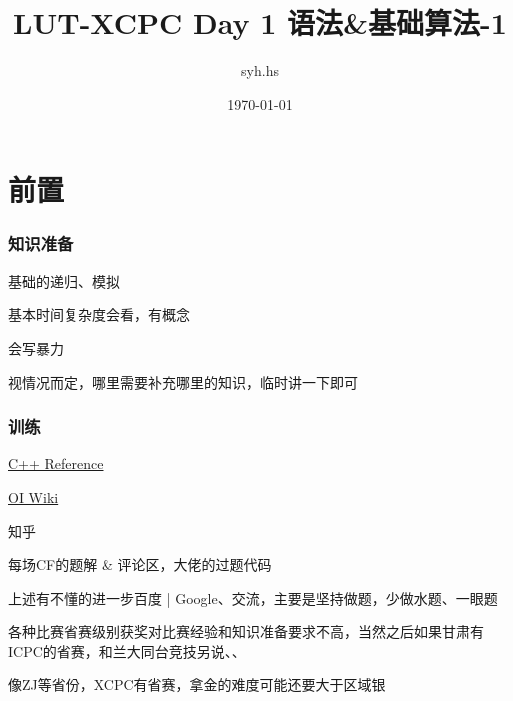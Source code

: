 \documentclass{beamer}
\author{syh.hs}
\title{LUT-XCPC Day 1 语法\&基础算法-1}
\date{\today}
\institute{兰州理工大学}
\begin{document}

  
  
  
  \section{前置}


  \begin{frame}
    \frametitle{知识准备}
    基础的递归、模拟

    基本时间复杂度会看，有概念

    会写暴力

    视情况而定，哪里需要补充哪里的知识，临时讲一下即可
  \end{frame}
  \begin{frame}
    \frametitle{训练}
    \href{https://en.cppreference.com/w/}{C++ Reference}

    \href{https://oi-wiki.org/}{OI Wiki}

    知乎

    每场CF的题解 \& 评论区，大佬的过题代码

    \vspace*{1\baselineskip}
    
    上述有不懂的进一步百度 | Google、交流，主要是坚持做题，少做水题、一眼题
    
    \vspace*{1\baselineskip}
    
    各种比赛省赛级别获奖对比赛经验和知识准备要求不高，当然之后如果甘肃有ICPC的省赛，和兰大同台竞技另说、、
    
    \vspace*{1\baselineskip}

    像ZJ等省份，XCPC有省赛，拿金的难度可能还要大于区域银
  \end{frame}
\end{document}
